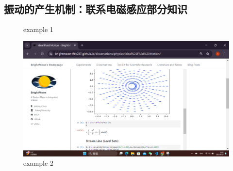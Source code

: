 \documentclass[UTF-8]{ctexart}
\begin{document}
\subsection{振动的产生机制：联系电磁感应部分知识}
 \begin{figure}
    \centering
    \caption{example 1}  
    \label{example 1}
 \end{figure}

\begin{figure}
    \centering
    \includegraphics[width=0.7\linewidth]{../Figures/example 3.png}
    \caption{example 2}
    \label{example 2}
\end{figure}
\end{document}
